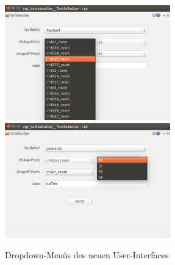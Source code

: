 \documentclass[a4paper,12pt,headsepline]{scrartcl}
\begin{document}
				\begin{figure} [H]
					\centering
					\includegraphics[height=5cm]{Images/Turtlebutler_Rooms.png}
					\includegraphics[height=5cm]{Images/Turtlebutler_Positions.png}
					\caption{Dropdown-Menüs des neuen User-Interfaces}
					\label{fig:NewUIDropdown}
				\end{figure}
			
\end{document}
